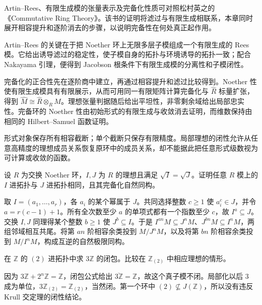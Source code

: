 \ProseParagraphBreak
Artin–Rees、有限生成模的张量表示及完备化性质可对照松村英之的《Commutative Ring Theory》\cite[\S8, Theorems 8.5--8.14, pp. 59--62]{Matsumura1989CommutativeRingTheory}。该书的证明将滤过与有限生成相联系，本章同时展开相容提升和逐阶消去的步骤，以说明完备性在何处真正起作用。








\begin{chaptersummary}
	Artin–Rees 的关键在于把 Noether 环上无限多层子模组成一个有限生成的 Rees 模。它给出诱导滤过的稳定性，使子模自身的拓扑与环境诱导的拓扑一致；配合 Nakayama 引理，便得到 Jacobson 根条件下有限生成模的分离性和子模闭性。

	\ProseParagraphBreak
	完备化的正合性先在逐阶商中建立，再通过相容提升和滤过比较得到。Noether 性使有限生成模具有有限展示，从而可用同一有限矩阵计算完备化与 \(\widehat R\) 标量扩张，得到 \(\widehat M\cong\widehat R\otimes_RM\)。理想张量判据随后给出平坦性，非零剩余域给出局部忠实性。完备环的 Noether 性由初始形式的有限生成与收敛消去证明，而维数保持由相同的 Hilbert–Samuel 函数证明。

	\ProseParagraphBreak
	形式对象保存所有相容截断；单个截断只保存有限精度。局部理想的闭性允许从任意高精度的理想成员关系恢复原环中的成员关系，却不能据此把任意形式级数视为可计算或收敛的函数。
\end{chaptersummary}

\BookExercises

\begin{exercise}\label{b3:ex:13-equivalent-ideals}
	设 \(R\) 为交换 Noether 环，\(I,J\) 为 \(R\) 的理想且满足 \(\sqrt I=\sqrt J\)。证明任意 \(R\) 模上的 \(I\) 进拓扑与 \(J\) 进拓扑相同，且其完备化自然同构。
\end{exercise}
\begin{solution}
	取 \(I=(a_1,\ldots,a_r)\)，各 \(a_i\) 的某个幂属于 \(J\)。共同选择整数 \(c\ge1\) 使 \(a_i^c\in J\)，并令 \(a=r(c-1)+1\)。所有全次数至少 \(a\) 的单项式都有一个指数至少 \(c\)，故 \(I^a\subseteq J\)。交换 \(I,J\) 同理得某个整数 \(b\ge1\) 使 \(J^b\subseteq I\)。于是 \(I^{an}M\subseteq J^nM\)、\(J^{bn}M\subseteq I^nM\)，两组邻域相互共尾。将第 \(an\) 阶相容余类投到 \(M/J^nM\)，以及将第 \(bn\) 阶相容余类投到 \(M/I^nM\)，构成互逆的自然极限同构。
\end{solution}

\begin{exercise}\label{b3:ex:13-nonclosed-submodule}
	在 \(\mathbb Z\) 的 \((2)\) 进拓扑中求 \(3\mathbb Z\) 的闭包。比较在 \(\mathbb Z_{(2)}\) 中相应理想的情形。
\end{exercise}
\begin{solution}
	因为 \(3\mathbb Z+2^n\mathbb Z=\mathbb Z\)，闭包公式给出 \(\overline{3\mathbb Z}=\mathbb Z\)，故这个真子模不闭。局部化以后 \(3\) 成为单位，\(3\mathbb Z_{(2)}=\mathbb Z_{(2)}\)，当然闭。第一个环中 \((2)\not\subseteq J(\mathbb Z)\)，所以没有违反 Krull 交定理的闭性结论。
\end{solution}

